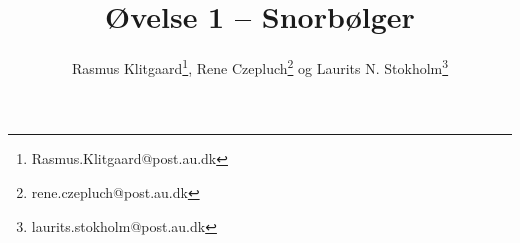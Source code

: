 \documentclass[danish,a4paper,twocolumn, oneside]{memoir}
\title{Øvelse 1 – Snorbølger}
\author{Rasmus Klitgaard\thanks{Rasmus.Klitgaard@post.au.dk}, Rene Czepluch\thanks{rene.czepluch@post.au.dk} og Laurits N. Stokholm\thanks{laurits.stokholm@post.au.dk}}
\date
\begin{document}
\maketitle
\noindent







\end{document}
